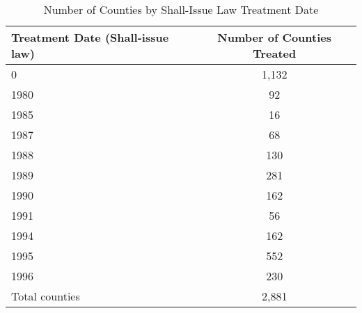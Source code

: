 \begin{table}[htbp]\centering
\caption{Number of Counties by Shall-Issue Law Treatment Date}\label{tab:countybycohort}
\begin{tabular}{lc}
\toprule
\textbf{Treatment Date (Shall-issue law)} & \textbf{Number of Counties Treated} \\
\midrule
0           &       1,132\\
1980        &          92\\
1985        &          16\\
1987        &          68\\
1988        &         130\\
1989        &         281\\
1990        &         162\\
1991        &          56\\
1994        &         162\\
1995        &         552\\
1996        &         230\\
\midrule
Total counties &     2,881 \\
\bottomrule
\end{tabular}
\end{table}
